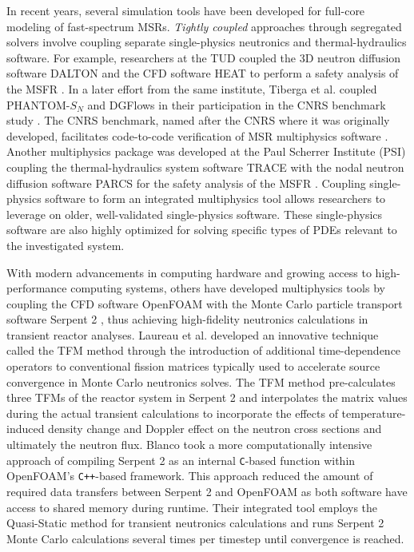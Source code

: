 In recent years, several simulation tools have been developed for full-core
modeling of fast-spectrum \glspl{MSR}. \textit{Tightly coupled} approaches
through segregated solvers involve coupling separate single-physics neutronics
and thermal-hydraulics software. For example, researchers at
the \gls{TUD} coupled the 3D neutron diffusion software DALTON
\cite{boer_validation_2010} and the CFD software HEAT
\cite{de_zwaan_static_2007} to perform a safety analysis of the \gls{MSFR}
\cite{fiorina_modelling_2014}. In a later effort from the same institute,
Tiberga et al. \cite{tiberga_discontinuous_2019} coupled PHANTOM-$S_N$ and
DGFlows in their participation in the CNRS benchmark study
\cite{tiberga_results_2020}. The CNRS benchmark, named after the \gls{CNRS}
where it was originally developed, facilitates code-to-code verification of
\gls{MSR} multiphysics software \cite{aufiero_testing_2018}. Another
multiphysics package was developed at the Paul Scherrer Institute (PSI)
coupling the thermal-hydraulics system software \gls{TRACE}
\cite{nrc_trace_2007} with the
nodal neutron diffusion software \gls{PARCS} \cite{downar_parcs_2010} for the
safety analysis of the \gls{MSFR} \cite{pettersen_coupled_2016}. Coupling
single-physics software to form an integrated multiphysics tool allows
researchers to leverage on older, well-validated single-physics software.
These single-physics software are also highly optimized for solving specific
types of \glspl{PDE} relevant to the investigated system.

With modern advancements in computing hardware and growing access to
high-performance computing systems, others have
developed multiphysics tools by coupling the \gls{CFD} software OpenFOAM
\cite{openfoam_openfoam_2021} with the Monte Carlo particle transport software
Serpent 2 \cite{leppanen_serpent_2014}, thus achieving high-fidelity neutronics
calculations in transient reactor analyses. Laureau et al.
\cite{laureau_transient_2017} developed an innovative technique called the
\gls{TFM} method through the introduction of additional time-dependence
operators to conventional fission matrices typically used to accelerate source
convergence in Monte Carlo neutronics solves. The \gls{TFM} method
pre-calculates three \glspl{TFM} of the reactor system in Serpent 2 and
interpolates the matrix values during the actual transient calculations to
incorporate the effects of temperature-induced density change and Doppler
effect on the neutron cross sections and ultimately the neutron flux. Blanco
\cite{blanco_neutronic_2020} took a more computationally intensive approach of
compiling Serpent 2 as an internal \texttt{C}-based function within OpenFOAM's
\texttt{C++}-based framework. This approach reduced the amount of required data
transfers between Serpent 2 and OpenFOAM as both software have access to shared
memory during runtime. Their integrated tool employs the Quasi-Static
method for transient neutronics calculations and runs Serpent 2 Monte Carlo
calculations several times per timestep until convergence is reached.

